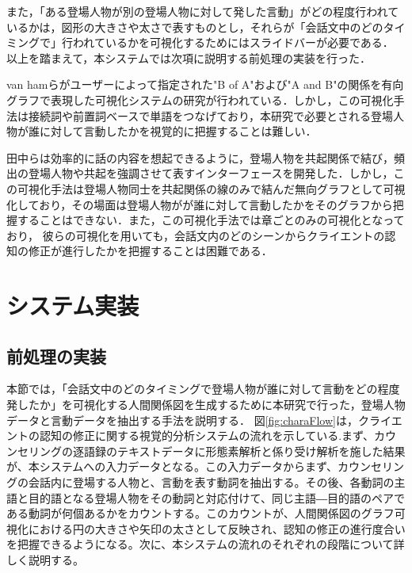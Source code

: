 \documentclass[shuuron]{kuee}
\begin{document}
また，「ある登場人物が別の登場人物に対して発した言動」がどの程度行われているかは，図形の大きさや太さで表すものとし，それらが「会話文中のどのタイミングで」行われているかを可視化するためにはスライドバーが必要である．
以上を踏まえて，本システムでは次項に説明する前処理の実装を行った．


van hamら\cite{van2009mapping}がユーザーによって指定された"B of A"および"A and B"の関係を有向グラフで表現した可視化システムの研究が行われている．しかし，この可視化手法は接続詞や前置詞ベースで単語をつなげており，本研究で必要とされる登場人物が誰に対して言動したかを視覚的に把握することは難しい．

田中ら\cite{tanaka}は効率的に話の内容を想起できるように，登場人物を共起関係で結び，頻出の登場人物や共起を強調させて表すインターフェースを開発した．しかし，この可視化手法は登場人物同士を共起関係の線のみで結んだ無向グラフとして可視化しており，その場面は登場人物がが誰に対して言動したかをそのグラフから把握することはできない．また，この可視化手法では章ごとのみの可視化となっており， 彼らの可視化を用いても，会話文内のどのシーンからクライエントの認知の修正が進行したかを把握することは困難である．





\section{システム実装} %

\subsection{前処理の実装} %


本節では，「会話文中のどのタイミングで登場人物が誰に対して言動をどの程度発したか」を可視化する人間関係図を生成するために本研究で行った，登場人物データと言動データを抽出する手法を説明する．%
 図\ref{fig:charaFlow}は，クライエントの認知の修正に関する視覚的分析システムの流れを示している.まず、カウンセリングの逐語録のテキストデータに形態素解析と係り受け解析を施した結果が、本システムへの入力データとなる。この入力データからまず、カウンセリングの会話内に登場する人物と、言動を表す動詞を抽出する。その後、各動詞の主語と目的語となる登場人物をその動詞と対応付けて、同じ主語―目的語のペアである動詞が何個あるかをカウントする。このカウントが、人間関係図のグラフ可視化における円の大きさや矢印の太さとして反映され、認知の修正の進行度合いを把握できるようになる。次に、本システムの流れのそれぞれの段階について詳しく説明する。
\end{document}
